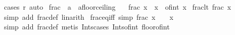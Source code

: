 \begin{isabellebody}
\isamarkupfalse%
\ {\isacharparenleft}{\kern0pt}cases\ {\isachardoublequoteopen}r{\isasymge}{}{\isachardoublequoteclose}{\isacharparenright}{\kern0pt}\ auto%
\endisatagproof
{\isafoldproof}%
%
\isadelimproof
%
\endisadelimproof
%
\isadelimdocument
%
\endisadelimdocument
%
\isatagdocument
%
\isamarkuptrue%
%
\endisatagdocument
{\isafolddocument}%
%
\isadelimdocument
%
\endisadelimdocument
{}\isamarkupfalse%
\ frac\ {\isacharcolon}{\kern0pt}{\isacharcolon}{\kern0pt}\ {\isachardoublequoteopen}{\isacharprime}{\kern0pt}a\ {\isasymRightarrow}\ {\isacharprime}{\kern0pt}a{\isacharcolon}{\kern0pt}{\isacharcolon}{\kern0pt}floor{\isacharunderscore}{\kern0pt}ceiling{\isachardoublequoteclose}\isanewline
\ \ \ {\isachardoublequoteopen}frac\ x\ {\isasymequiv}\ x\ {\isacharminus}{\kern0pt}\ of{\isacharunderscore}{\kern0pt}int\ {\isasymlfloor}x{\isasymrfloor}{\isachardoublequoteclose}\isanewline
\isanewline
{}\isamarkupfalse%
\ frac{\isacharunderscore}{\kern0pt}lt{\isacharunderscore}{\kern0pt}{}{\isacharcolon}{\kern0pt}\ {\isachardoublequoteopen}frac\ x\ {\isacharless}{\kern0pt}\ {}{\isachardoublequoteclose}\isanewline
%
\isadelimproof
\ \ %
\endisadelimproof
%
\isatagproof
{}\isamarkupfalse%
\ {\isacharparenleft}{\kern0pt}simp\ add{\isacharcolon}{\kern0pt}\ frac{\isacharunderscore}{\kern0pt}def{\isacharparenright}{\kern0pt}\ linarith%
\endisatagproof
{\isafoldproof}%
%
\isadelimproof
\isanewline
%
\endisadelimproof
\isanewline
{}\isamarkupfalse%
\ frac{\isacharunderscore}{\kern0pt}eq{\isacharunderscore}{\kern0pt}{}{\isacharunderscore}{\kern0pt}iff\ {\isacharbrackleft}{\kern0pt}simp{\isacharbrackright}{\kern0pt}{\isacharcolon}{\kern0pt}\ {\isachardoublequoteopen}frac\ x\ {\isacharequal}{\kern0pt}\ {}\ {\isasymlongleftrightarrow}\ x\ {\isasymin}\ {\isasymint}{\isachardoublequoteclose}\isanewline
%
\isadelimproof
\ \ %
\endisadelimproof
%
\isatagproof
{}\isamarkupfalse%
\ {\isacharparenleft}{\kern0pt}simp\ add{\isacharcolon}{\kern0pt}\ frac{\isacharunderscore}{\kern0pt}def{\isacharparenright}{\kern0pt}\ {\isacharparenleft}{\kern0pt}metis\ Ints{\isacharunderscore}{\kern0pt}cases\ Ints{\isacharunderscore}{\kern0pt}of{\isacharunderscore}{\kern0pt}int\ floor{\isacharunderscore}{\kern0pt}of{\isacharunderscore}{\kern0pt}int\ {\isacharparenright}{\kern0pt}%
\endisatagproof
{\isafoldproof}%
%
\isadelimproof
\isanewline
%
\endisadelimproof
\isanewline
{}\isamarkupfalse%

\end{isabellebody}
